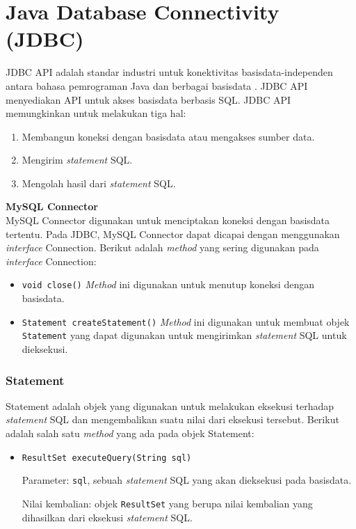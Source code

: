 \section{Java Database Connectivity (JDBC)}
\label{sec:jdbc}
JDBC API adalah standar industri untuk konektivitas basisdata-independen antara bahasa pemrograman Java dan berbagai basisdata \cite{jdbc}. JDBC API menyediakan API untuk akses basisdata berbasis SQL. JDBC API memungkinkan untuk melakukan tiga hal: 
\begin{enumerate}
	\item Membangun koneksi dengan basisdata atau mengakses sumber data.
	\item Mengirim \textit{statement} SQL.
	\item Mengolah hasil dari \textit{statement} SQL.
\end{enumerate}

\textbf{MySQL Connector}\\
MySQL Connector digunakan untuk menciptakan koneksi dengan basisdata tertentu. Pada JDBC, MySQL Connector dapat dicapai dengan menggunakan \textit{interface} Connection. Berikut adalah \textit{method} yang sering digunakan pada \textit{interface} Connection:
\begin{itemize}
	\item \texttt{void close()}
	\textit{Method} ini digunakan untuk menutup koneksi dengan basisdata.
	
	\item \texttt{Statement createStatement()}
	\textit{Method} ini digunakan untuk membuat objek \texttt{Statement} yang dapat digunakan untuk mengirimkan \textit{statement} SQL untuk dieksekusi.
\end{itemize}

\subsubsection{Statement}
Statement adalah objek yang digunakan untuk melakukan eksekusi terhadap \textit{statement} SQL dan mengembalikan suatu nilai dari eksekusi tersebut. Berikut adalah salah satu \textit{method} yang ada pada objek Statement:
\begin{itemize}
	\item \texttt{ResultSet executeQuery(String sql)}
	
	Parameter: \texttt{sql}, sebuah \textit{statement} SQL yang akan dieksekusi pada basisdata.
	
	Nilai kembalian: objek \texttt{ResultSet} yang berupa nilai kembalian yang dihasilkan dari eksekusi \textit{statement} SQL.
\end{itemize}

